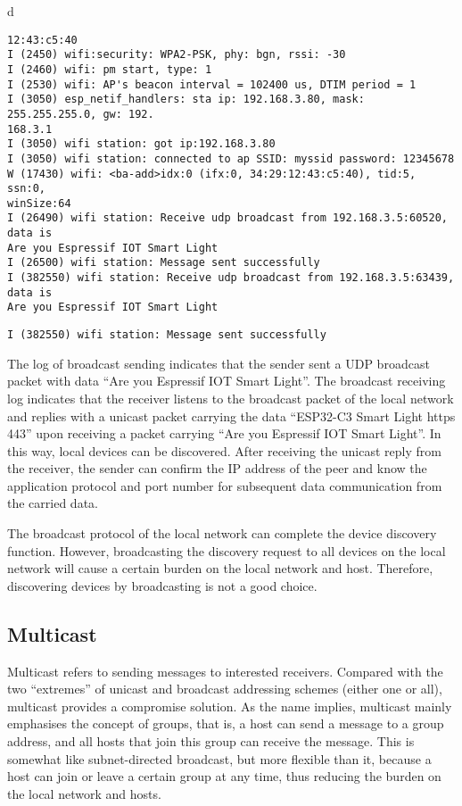 \documentclass[a4paper,12pt]{book}
\begin{document}
\begin{codebloc}
\begin{tabular}{d}
\vspace{2pt}
\begin{verbatim}
12:43:c5:40
I (2450) wifi:security: WPA2-PSK, phy: bgn, rssi: -30 
I (2460) wifi: pm start, type: 1 
I (2530) wifi: AP's beacon interval = 102400 us, DTIM period = 1 
I (3050) esp_netif_handlers: sta ip: 192.168.3.80, mask: 255.255.255.0, gw: 192.
168.3.1 
I (3050) wifi station: got ip:192.168.3.80 
I (3050) wifi station: connected to ap SSID: myssid password: 12345678 
W (17430) wifi: <ba-add>idx:0 (ifx:0, 34:29:12:43:c5:40), tid:5, ssn:0, 
winSize:64 
I (26490) wifi station: Receive udp broadcast from 192.168.3.5:60520, data is 
Are you Espressif IOT Smart Light
I (26500) wifi station: Message sent successfully 
I (382550) wifi station: Receive udp broadcast from 192.168.3.5:63439, data is 
Are you Espressif IOT Smart Light 
\end{verbatim}
\verb|I (382550) wifi station: Message sent successfully|
\end{tabular}
\end{codebloc}

The log of broadcast sending indicates that the sender sent a UDP broadcast packet with data “Are you Espressif IOT Smart Light”. The broadcast receiving log indicates that the receiver listens to the broadcast packet of the local network and replies with a unicast packet carrying the data “ESP32-C3 Smart Light https 443” upon receiving a packet carrying “Are you Espressif IOT Smart Light”. In this way, local devices can be discovered. After receiving the unicast reply from the receiver, the sender can confirm the IP address of the peer and know the application protocol and port number for subsequent data communication from the carried data.

The broadcast protocol of the local network can complete the device discovery function. However, broadcasting the discovery request to all devices on the local network will cause a certain burden on the local network and host. Therefore, discovering devices by broadcasting is not a good choice.

\subsection{Multicast}
Multicast refers to sending messages to interested receivers. Compared with the two “extremes” of unicast and broadcast addressing schemes (either one or all), multicast provides a compromise solution. As the name implies, multicast mainly emphasises the concept of groups, that is, a host can send a message to a group address, and all hosts that join this group can receive the message. This is somewhat like subnet-directed broadcast, but more flexible than it, because a host can join or leave a certain group at any time, thus reducing the burden on the local network and hosts.
\end{document}
